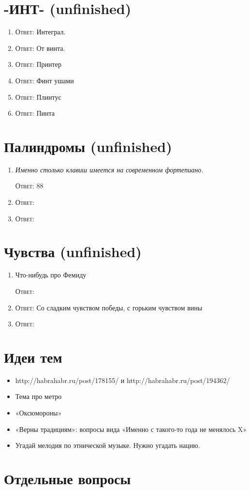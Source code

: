 \documentclass[a4paper,10pt]{article}
\let\keyword\textsc
\newenvironment{topic}{\begin{enumerate}}{\end{enumerate}}
\newcommand{\question}[3]{\item[#1.] #2 \par \keyword{Ответ:} #3}
\begin{document}
\section{-ИНТ- (unfinished)}

\begin{topic}
 \question{10}{<анекдот про интеграл>}{Интеграл.}
 \question{20}{}{От винта.}
 \question{??}{}{Принтер}
 \question{??}{}{Финт ушами}
 \question{??}{}{Плинтус}
 \question{??}{}{Пинта}
\end{topic}


\section{Палиндромы (unfinished)}

\begin{topic}
 \question{10}{\emph{Именно столько клавиш имеется на современном фортепиано.}}{88}
 \question{??}{}{}  %
 \question{??}{}{}
\end{topic}


\section{Чувства (unfinished)}


\begin{topic}
 \question{??}{Что-нибудь про Фемиду}{}
 \question{??}{}{Со сладким чувством победы, с горьким чувством вины }
 \question{??}{}{}
\end{topic}


\section{Идеи тем}

\begin{itemize}
 \item http://habrahabr.ru/post/178155/ и http://habrahabr.ru/post/194362/
 \item Тема про метро
 \item «Оксюмороны»
 \item «Верны традициям»: вопросы вида «Именно с такого-то года не менялось X»
 \item Угадай мелодия по этнической музыке. Нужно угадать нацию.
\end{itemize}


\section{Отдельные вопросы}
\end{document}
